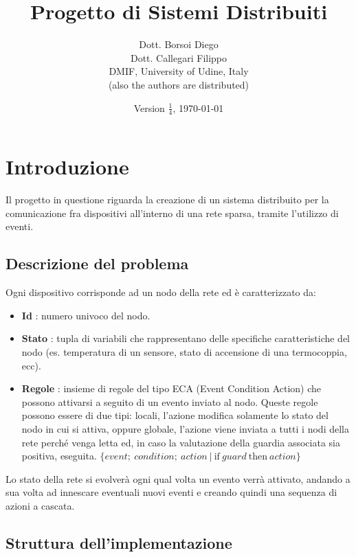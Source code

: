 \documentclass[italian]{memoir}
\title{Progetto di Sistemi Distribuiti}
\author{Dott. Borsoi Diego\\Dott. Callegari Filippo\\ DMIF, University of Udine,
	   Italy\\(also the authors are distributed)}
\date{Version $\frac{1}{4}$, \today}
\begin{document}
\maketitle
\newpage

\tableofcontents
\newpage



\chapter{Introduzione}\label{ch:intro}

Il progetto in questione riguarda la creazione di un sistema distribuito per la comunicazione
	   fra dispositivi all'interno di una rete sparsa, tramite l'utilizzo di eventi.

\section{Descrizione del problema}

Ogni dispositivo corrisponde ad un nodo della rete ed è caratterizzato da:
\begin{itemize}
\item \textbf{Id} : numero univoco del nodo.
\item \textbf{Stato} : tupla di variabili che rappresentano delle specifiche caratteristiche
	   del nodo (es. temperatura di un sensore, stato di accensione di una termocoppia,
	   ecc).
\item \textbf{Regole} : insieme di regole del tipo ECA (Event Condition Action) che
	   possono attivarsi a seguito di un evento inviato al nodo. Queste regole possono
	   essere
	   di due tipi: locali, l'azione modifica solamente lo stato del nodo in cui si
	   attiva,
	   oppure globale, l'azione viene inviata a tutti i nodi della rete perché venga
	   letta
	   ed, in caso la valutazione della guardia associata sia positiva, eseguita.
\center$\{event;~condition;~action~|~\text{if}~guard~\text{then}~action\}$
\end{itemize}

Lo stato della rete si evolverà ogni qual volta un evento verrà attivato, andando
	   a sua volta ad innescare eventuali nuovi eventi e creando quindi una sequenza
	   di
	   azioni a cascata.

\section{Struttura dell'implementazione}
\end{document}
